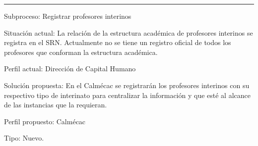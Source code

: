 \hrule
\vspace{0.2cm}
\begin{Cdescription}
	\item[Subproceso:] Registrar profesores interinos
	\item[Situación actual:] La relación de la estructura académica de profesores interinos se registra en el SRN. Actualmente no se tiene un registro oficial de todos los profesores que conforman la estructura académica.
	\item[Perfil actual:] Dirección de Capital Humano
	\item[Solución propuesta:] En el Calmécac se registrarán los profesores interinos con su respectivo tipo de interinato para centralizar la información y  que esté al alcance de las instancias que la requieran.
	\item[Perfil propuesto:] Calmécac
	\item[Tipo:] Nuevo.
\end{Cdescription}
	
